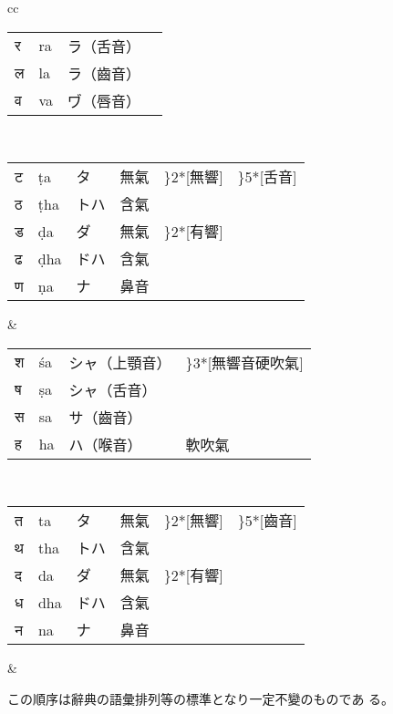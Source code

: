 \begin{tabular}{cc}
\begin{minipage}{0.46\hsize}
\begin{tabular}{llll}
  {\dnf र} & ra & ラ（舌音） & \\
  {\dnf ल} & la & ラ（齒音） & \\
  {\dnf व} & va & ヷ（唇音） &
  \end{tabular}
  \end{minipage}
  \\
  \begin{minipage}{0.46\hsize}
  \begin{tabular}{llp{}lll}
  {\dnf ट} & ṭa & タ & 無氣 & \rdelim\}{2}{*}[\parbox{1\zw}{無響}] & \rdelim\}{5}{*}[舌音] \\
  {\dnf ठ} & ṭha & トハ & 含氣 & & \\
  {\dnf ड} & ḍa & ダ & 無氣 & \rdelim\}{2}{*}[\parbox{1\zw}{有響}] & \\
  {\dnf ढ} & ḍha & ドハ & 含氣 & & \\
  {\dnf ण} & ṇa & ナ & 鼻音 &
  \end{tabular}
  \end{minipage}
  &
  \begin{minipage}{0.46\hsize}
  \begin{tabular}{llll}
  {\dnf श} & śa & シャ（上顎音） & \rdelim\}{3}{*}[\parbox{3\zw}{無響音硬吹氣}] \\
  {\dnf ष} & ṣa & シャ（舌音） & \\
  {\dnf स} & sa & サ（齒音） & \\
  {\dnf ह} & ha & ハ（喉音） & 軟吹氣
  \end{tabular}
  \end{minipage}
  \\
  \begin{minipage}{0.46\hsize}
  \begin{tabular}{llp{}lll}
  {\dnf त} & ta & タ & 無氣 & \rdelim\}{2}{*}[\parbox{1\zw}{無響}] & \rdelim\}{5}{*}[齒音] \\
  {\dnf थ} & tha & トハ & 含氣 & & \\
  {\dnf द} & da & ダ & 無氣 & \rdelim\}{2}{*}[\parbox{1\zw}{有響}] & \\
  {\dnf ध} & dha & ドハ & 含氣 & & \\
  {\dnf न} & na & ナ & 鼻音 &
  \end{tabular}
  \end{minipage}
  &
\end{tabular}

この順序は辭典の語彙排列等の標準となり一定不變のものであ
る。

